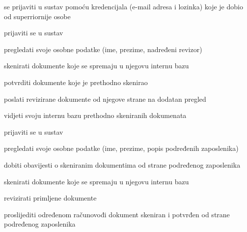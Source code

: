 			
			\begin{packed_enum}
				
				\item  {}
				\begin{packed_enum}
					
					\item se prijaviti u sustav pomoću kredencijala (e-mail adresa i lozinka) koje je dobio od superriornije osobe 
					
				\end{packed_enum}
			
				\item  {}
				\begin{packed_enum}
					
					\item prijaviti se u sustav
					\item pregledati svoje osobne podatke (ime, prezime, nadređeni revizor)
					\item skenirati dokumente koje se spremaju u njegovu internu bazu
					\item potvrditi dokumente koje je prethodno skenirao
					\item poslati revizirane dokumente od njegove strane na dodatan pregled
					\item vidjeti svoju internu bazu prethodno skeniranih dokumenata
					
				\end{packed_enum}
				
				\item  {}
				\begin{packed_enum}
					
					\item prijaviti se u sustav
					\item pregledati svoje osobne podatke (ime, prezime, popis podređenih zaposlenika)
					\item dobiti obavijesti o skeniranim dokumentima od strane podređenog zaposlenika
					\item skenirati dokumente koje se spremaju u njegovu internu bazu
					\item revizirati primljene dokumente
					\item proslijediti određenom računovođi dokument skeniran i potvrđen od strane podređenog zaposlenika
					
				\end{packed_enum}
				
			\end{packed_enum}
			
